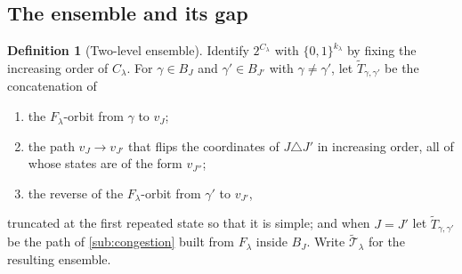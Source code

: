 \documentclass[aos]{imsart}
\theoremstyle{plain}
\theoremstyle{definition}
\newtheorem{definition}{Definition}[section]
\begin{document}
    \subsection{The ensemble and its gap}

    \begin{definition}[Two-level ensemble]
        \label{def:flowens}
        Identify $2^{C_\lambda}$ with $\{0,1\}^{k_\lambda}$ by fixing the
        increasing order of $C_\lambda$. For $\gamma\in B_J$ and
        $\gamma'\in B_{J'}$ with $\gamma\neq\gamma'$, let
        $\widetilde T_{\gamma,\gamma'}$ be the concatenation of
        \begin{enumerate}[label=(\roman*),leftmargin=2.6em,noitemsep]
            \item the $F_\lambda$-orbit from $\gamma$ to $v_J$;
            \item the path $v_J\to v_{J'}$ that flips the coordinates of
            $J\triangle J'$ in increasing order, all of whose states are of
            the form $v_{J''}$;
            \item the reverse of the $F_\lambda$-orbit from $\gamma'$ to
            $v_{J'}$,
        \end{enumerate}
        truncated at the first repeated state so that it is simple; and when
        $J=J'$ let $\widetilde T_{\gamma,\gamma'}$ be the path of
        \cref{sub:congestion} built from $F_\lambda$ inside $B_J$. Write
        $\widetilde{\mathcal{T}}_\lambda$ for the resulting ensemble.
    \end{definition}
\end{document}
